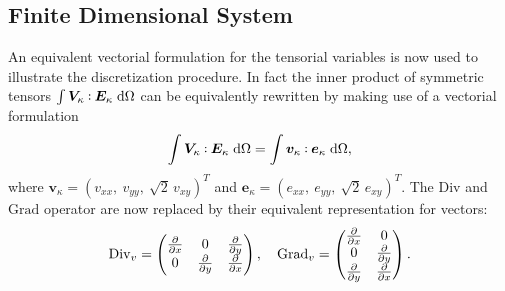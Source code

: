 \documentclass{ifacconf}
\def\onedot{$\mathsurround0pt\ldotp$}
\def\cddot{%
	\mathbin{\vcenter{\baselineskip.67ex
			\hbox{\onedot}\hbox{\onedot}}%
}}
\begin{document}
\subsection{Finite Dimensional System}
\label{subsec:finPHs}

An equivalent vectorial formulation for the tensorial variables is now used to illustrate the discretization procedure. In fact the inner product of symmetric tensors $\int \bm{V}_{\kappa} \cddot \bm{E}_{\kappa} \d\Omega$ can be equivalently rewritten by making use of a vectorial formulation
\begin{equation*}
	\int \bm{V}_{\kappa} \cddot \bm{E}_{\kappa} \d\Omega = \int \bm{v}_{\kappa} \cddot \bm{e}_{\kappa} \d\Omega,
\end{equation*}
where $\bm{v}_{\kappa} = (v_{xx}, \ v_{yy}, \ \sqrt{2} \,v_{xy})^T$ and $\bm{e}_{\kappa} = (e_{xx},\ e_{yy},\ \sqrt{2}\, e_{xy})^T$. The $\mathrm{Div}$ and $\mathrm{Grad}$ operator are now replaced  by their equivalent representation for vectors:
\begin{equation}
	\mathrm{Div}_v = 
	\begin{pmatrix}
	\diffp{}{x} & 0 & \diffp{}{y} \\
	0 & \diffp{}{y} & \diffp{}{x} \\
	\end{pmatrix}, \quad
	\mathrm{Grad}_v = 
	\begin{pmatrix}
	\diffp{}{x} & 0 \\
	0 & \diffp{}{y} \\
	\diffp{}{y} & \diffp{}{x} \\
	\end{pmatrix}. \\
\end{equation}
\end{document}

